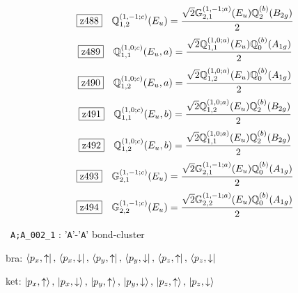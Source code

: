 \documentclass[fleqn,10pt,landscape]{jsarticle}
\begin{document}
\begin{dmath*}
\hspace*{3mm}\fbox{z488}\quad \mathbb{Q}_{1,2}^{(1,-1;c)}(E_{u})=\frac{\sqrt{2} \mathbb{G}_{2,1}^{(1,-1;a)}(E_{u}) \mathbb{Q}_{2}^{(b)}(B_{2g})}{2}
\end{dmath*}
\begin{dmath*}
\hspace*{3mm}\fbox{z489}\quad \mathbb{Q}_{1,1}^{(1,0;c)}(E_{u},a)=\frac{\sqrt{2} \mathbb{Q}_{1,1}^{(1,0;a)}(E_{u}) \mathbb{Q}_{0}^{(b)}(A_{1g})}{2}
\end{dmath*}
\begin{dmath*}
\hspace*{3mm}\fbox{z490}\quad \mathbb{Q}_{1,2}^{(1,0;c)}(E_{u},a)=\frac{\sqrt{2} \mathbb{Q}_{1,2}^{(1,0;a)}(E_{u}) \mathbb{Q}_{0}^{(b)}(A_{1g})}{2}
\end{dmath*}
\begin{dmath*}
\hspace*{3mm}\fbox{z491}\quad \mathbb{Q}_{1,1}^{(1,0;c)}(E_{u},b)=\frac{\sqrt{2} \mathbb{Q}_{1,2}^{(1,0;a)}(E_{u}) \mathbb{Q}_{2}^{(b)}(B_{2g})}{2}
\end{dmath*}
\begin{dmath*}
\hspace*{3mm}\fbox{z492}\quad \mathbb{Q}_{1,2}^{(1,0;c)}(E_{u},b)=\frac{\sqrt{2} \mathbb{Q}_{1,1}^{(1,0;a)}(E_{u}) \mathbb{Q}_{2}^{(b)}(B_{2g})}{2}
\end{dmath*}
\begin{dmath*}
\hspace*{3mm}\fbox{z493}\quad \mathbb{G}_{2,1}^{(1,-1;c)}(E_{u})=\frac{\sqrt{2} \mathbb{G}_{2,1}^{(1,-1;a)}(E_{u}) \mathbb{Q}_{0}^{(b)}(A_{1g})}{2}
\end{dmath*}
\begin{dmath*}
\hspace*{3mm}\fbox{z494}\quad \mathbb{G}_{2,2}^{(1,-1;c)}(E_{u})=\frac{\sqrt{2} \mathbb{G}_{2,2}^{(1,-1;a)}(E_{u}) \mathbb{Q}_{0}^{(b)}(A_{1g})}{2}
\end{dmath*}
\vspace{5mm}

\noindent\textbullet\, \texttt{A;A_002_1} : '\texttt{A}'-'\texttt{A}' bond-cluster

\noindent\quad * bra: $\bra{p_{x},\uparrow},\, \bra{p_{x},\downarrow},\, \bra{p_{y},\uparrow},\, \bra{p_{y},\downarrow},\, \bra{p_{z},\uparrow},\, \bra{p_{z},\downarrow}$

\noindent\quad * ket: $\ket{p_{x},\uparrow},\, \ket{p_{x},\downarrow},\, \ket{p_{y},\uparrow},\, \ket{p_{y},\downarrow},\, \ket{p_{z},\uparrow},\, \ket{p_{z},\downarrow}$
\end{document}
